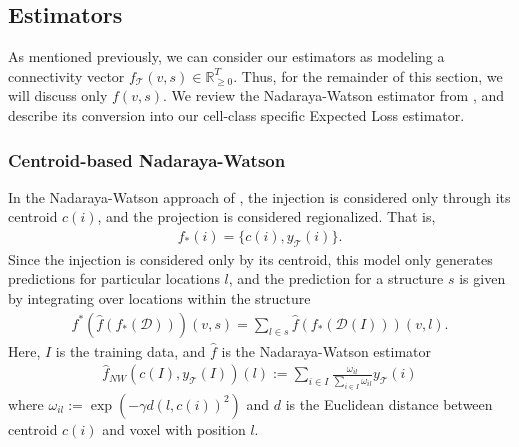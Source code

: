 
\newpage
\subsection{Estimators}
\label{supp_sec:estimators}
As mentioned previously, we can consider our estimators as modeling a connectivity vector $f_{\mathcal T} (v,s)  \in \mathbb R_{\geq 0}^T$.
Thus, for the remainder of this section, we will discuss only $f (v,s)$.
We review the Nadaraya-Watson estimator from  \citet{Knox2019-ot}, and describe its conversion into our cell-class specific Expected Loss estimator.

\subsubsection{Centroid-based Nadaraya-Watson}

In the Nadaraya-Watson approach of \citet{Knox2019-ot}, the injection is considered only through its centroid $c(i)$, and the projection is considered regionalized.
That is,
\begin{eqnarray*}
f_*(i) = \{c(i), y_{\mathcal T}(i)\}.
\end{eqnarray*}
Since the injection is considered only by its centroid, this model only generates predictions for particular locations $l$, and the prediction for a structure $s$ is given by integrating over locations within the structure
\begin{eqnarray*}
\label{eq:regionalize}
f^* (\hat f (f_*(\mathcal D))) (v,s) = \sum_{l \in s} \hat f (f_*(\mathcal D(I))) (v,l ).
\end{eqnarray*}
Here, $I$ is the training data, and $\hat f$ is the Nadaraya-Watson estimator
\begin{eqnarray*}
\hat f_{NW}( c(I) , y_{\mathcal T}(I) ) (l) :=  \sum_{i \in I} \frac{ \omega_{i l}}{\sum_{i \in I} \omega_{i l}} y_{\mathcal T}(i)
\end{eqnarray*}
where $\omega_{i l } := \exp( - \gamma d( l , c(i))^2 )$ and $d$ is the Euclidean distance between centroid $c(i)$ and voxel with position $l$.

